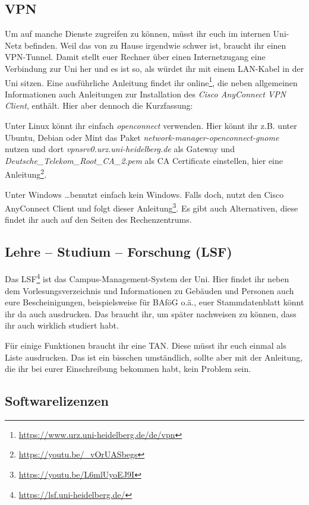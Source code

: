 \subsection{VPN}
Um auf manche Dienste zugreifen zu können, müsst ihr euch im internen Uni-Netz befinden. Weil das von zu Hause irgendwie schwer ist, braucht ihr einen VPN-Tunnel. Damit stellt euer Rechner über einen Internetzugang eine Verbindung zur Uni her und es ist so, als würdet ihr mit einem LAN-Kabel in der Uni sitzen. Eine ausführliche Anleitung findet ihr online\footnote{\url{https://www.urz.uni-heidelberg.de/de/vpn}}, die neben allgemeinen Informationen auch Anleitungen zur Installation des \emph{Cisco AnyConnect VPN Client}, enthält. Hier aber dennoch die Kurzfassung:

Unter Linux könnt ihr einfach \emph{openconnect} verwenden. Hier könnt ihr z.B. unter Ubuntu, Debian oder Mint das Paket \emph{network-manager-openconnect-gnome} nutzen und dort \emph{vpnsrv0.urz.uni-heidelberg.de} als Gateway und \emph{Deutsche\_Telekom\_Root\_CA\_2.pem} als CA Certificate einstellen, hier eine Anleitung\footnote{\url{https://youtu.be/_vOrUASbegs}}.

Unter Windows \ldots benutzt einfach kein Windows. Falls doch, nutzt den Cisco AnyConnect Client und folgt dieser Anleitung\footnote{\url{https://youtu.be/L6mlUyoEJ9I}}. Es gibt auch Alternativen, diese findet ihr auch auf den Seiten des Rechenzentrums.

\subsection{Lehre -- Studium -- Forschung (LSF)}
Das LSF\footnote{\url{https://lsf.uni-heidelberg.de/}} ist das Campus-Management-System der Uni. Hier findet ihr neben dem Vorlesungsverzeichnis und Informationen zu Gebäuden und Personen auch eure Bescheinigungen, beispielsweise für BAföG o.ä., euer Stammdatenblatt könnt ihr da auch ausdrucken. Das braucht ihr, um später nachweisen zu können, dass ihr auch wirklich studiert habt.

Für einige Funktionen braucht ihr eine TAN. Diese müsst ihr euch einmal als Liste ausdrucken. Das ist ein bisschen umständlich, sollte aber mit der Anleitung, die ihr bei eurer Einschreibung bekommen habt, kein Problem sein.

\subsection{Softwarelizenzen}

